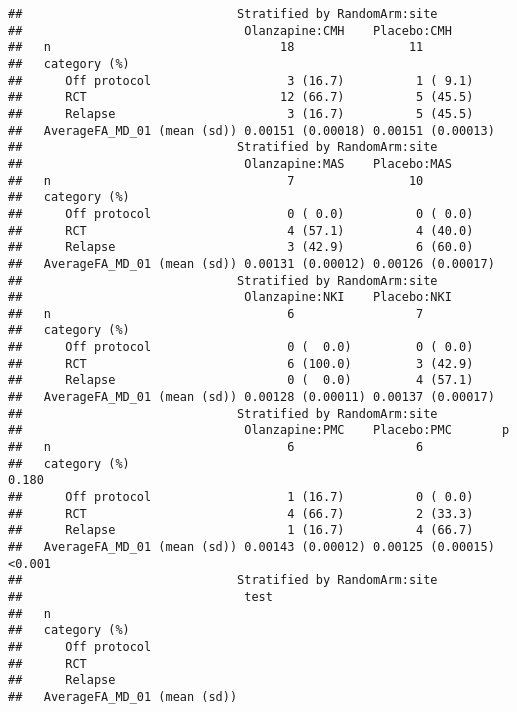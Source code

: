 \documentclass[]{article}
\theoremstyle{definition}
\theoremstyle{definition}
\theoremstyle{definition}
\theoremstyle{remark}
\begin{document}
\begin{verbatim}
##                              Stratified by RandomArm:site
##                               Olanzapine:CMH    Placebo:CMH      
##   n                                18                11          
##   category (%)                                                   
##      Off protocol                   3 (16.7)          1 ( 9.1)   
##      RCT                           12 (66.7)          5 (45.5)   
##      Relapse                        3 (16.7)          5 (45.5)   
##   AverageFA_MD_01 (mean (sd)) 0.00151 (0.00018) 0.00151 (0.00013)
##                              Stratified by RandomArm:site
##                               Olanzapine:MAS    Placebo:MAS      
##   n                                 7                10          
##   category (%)                                                   
##      Off protocol                   0 ( 0.0)          0 ( 0.0)   
##      RCT                            4 (57.1)          4 (40.0)   
##      Relapse                        3 (42.9)          6 (60.0)   
##   AverageFA_MD_01 (mean (sd)) 0.00131 (0.00012) 0.00126 (0.00017)
##                              Stratified by RandomArm:site
##                               Olanzapine:NKI    Placebo:NKI      
##   n                                 6                 7          
##   category (%)                                                   
##      Off protocol                   0 (  0.0)         0 ( 0.0)   
##      RCT                            6 (100.0)         3 (42.9)   
##      Relapse                        0 (  0.0)         4 (57.1)   
##   AverageFA_MD_01 (mean (sd)) 0.00128 (0.00011) 0.00137 (0.00017)
##                              Stratified by RandomArm:site
##                               Olanzapine:PMC    Placebo:PMC       p     
##   n                                 6                 6                 
##   category (%)                                                     0.180
##      Off protocol                   1 (16.7)          0 ( 0.0)          
##      RCT                            4 (66.7)          2 (33.3)          
##      Relapse                        1 (16.7)          4 (66.7)          
##   AverageFA_MD_01 (mean (sd)) 0.00143 (0.00012) 0.00125 (0.00015) <0.001
##                              Stratified by RandomArm:site
##                               test
##   n                               
##   category (%)                    
##      Off protocol                 
##      RCT                          
##      Relapse                      
##   AverageFA_MD_01 (mean (sd))
\end{verbatim}
\end{document}
